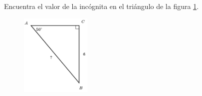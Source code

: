 Encuentra el valor de la incógnita en el triángulo de la figura \ref{fig:lados_functrig_08}.
\begin{figure}[H]
    \begin{center}
        \includegraphics[width=0.3\textwidth]{../images/lados_functrig_08.png}
    \end{center}
    \caption{}
    \label{fig:lados_functrig_08}
\end{figure}